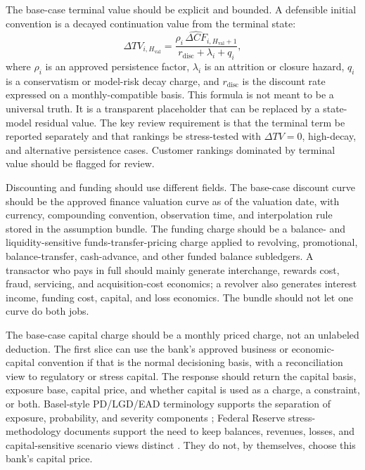 \documentclass[11pt]{article}
\newcommand{\1}{\mathbf{1}}
\begin{document}
The base-case terminal value should be explicit and bounded. A defensible
initial convention is a decayed continuation value from the terminal state:
\begin{equation}
  \Delta TV_{i,H_{\mathrm{val}}}
  =
  \frac{\rho_i \, \widehat{\Delta CF}_{i,H_{\mathrm{val}}+1}}
       {r_{\mathrm{disc}}+\lambda_i+q_i},
  \label{eq:terminal-value-base}
\end{equation}
where $\rho_i$ is an approved persistence factor, $\lambda_i$ is an attrition
or closure hazard, $q_i$ is a conservatism or model-risk decay charge, and
$r_{\mathrm{disc}}$ is the discount rate expressed on a monthly-compatible
basis. This formula is not meant to be a universal truth. It is a transparent
placeholder that can be replaced by a state-model residual value. The key
review requirement is that the terminal term be reported separately and that
rankings be stress-tested with $\Delta TV=0$, high-decay, and alternative
persistence cases. Customer rankings dominated by terminal value should be
flagged for review.

Discounting and funding should use different fields. The base-case discount
curve should be the approved finance valuation curve as of the valuation date,
with currency, compounding convention, observation time, and interpolation rule
stored in the assumption bundle. The funding charge should be a balance- and
liquidity-sensitive funds-transfer-pricing charge applied to revolving,
promotional, balance-transfer, cash-advance, and other funded balance
subledgers. A transactor who pays in full should mainly generate interchange,
rewards cost, fraud, servicing, and acquisition-cost economics; a revolver
also generates interest income, funding cost, capital, and loss economics. The
bundle should not let one curve do both jobs.

The base-case capital charge should be a monthly priced charge, not an
unlabeled deduction. The first slice can use the bank's approved business or
economic-capital convention if that is the normal decisioning basis, with a
reconciliation view to regulatory or stress capital. The response should
return the capital basis, exposure base, capital price, and whether capital is
used as a charge, a constraint, or both. Basel-style PD/LGD/EAD terminology
supports the separation of exposure, probability, and severity components
\citep{bcbs2006basel}; Federal Reserve stress-methodology documents support
the need to keep balances, revenues, losses, and capital-sensitive scenario
views distinct \citep{federalreserve2025stressmethodology,
federalreserve2026stressmethodology}. They do not, by themselves, choose this
bank's capital price.
\end{document}
